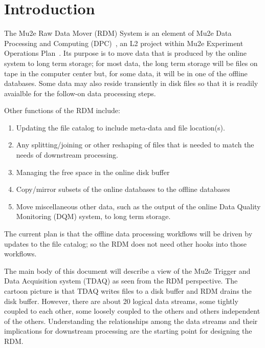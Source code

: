 \chapter{Introduction}

\label{ch:intro}

The Mu2e Raw Data Mover (RDM) System is an element of Mu2e Data Processing
and Computing (DPC)~\cite{DPC}, an L2 project within Mu2e Experiment Operations Plan~\cite{PEOP}.
Its purpose is to move data
that is produced by the online system to long term storage;
for most data, the long term storage will be files on tape in the computer center
but, for some data, it will be in one of the offline databases.
Some data may also reside transiently in disk files so that
it is readily avaialble for the follow-on data processing steps.

Other functions of the RDM include:
\begin{enumerate}
\item Updating the file catalog to include meta-data and file location(s).
\item Any splitting/joining or other reshaping of files that is needed to match the needs of downstream processing.
\item Managing the free space in the online disk buffer
\item Copy/mirror subsets of the online databases to the offline databases
\item Move miscellaneous other data, such as the output of the online Data Quality Monitoring (DQM) system, to long term storage.
\end{enumerate}

The current plan is that the offline data processing workflows will be driven by updates to the file catalog;
so the RDM does not need other hooks into those workflows.



The main body of this document will describe a view of the
Mu2e Trigger and Data Acquisition system (TDAQ) as seen from the RDM perspective.
The cartoon picture is that TDAQ writes files to a disk buffer and RDM drains the disk buffer.
However, there are about 20 logical data streams, some tightly coupled to each
other, some loosely coupled to the others and others independent of the others.
Understanding the relationships among the data streams and their implications
for downstream processing are the starting point for designing the RDM.

